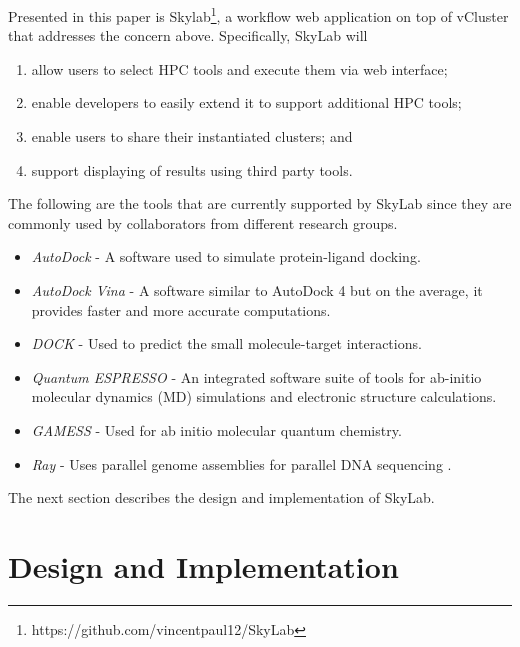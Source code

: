 Presented in this paper is Skylab\footnote{https://github.com/vincentpaul12/SkyLab}, a workflow web application on top of vCluster that addresses the concern above. Specifically, SkyLab will  

\begin{enumerate}
	\item allow users to select HPC tools and execute them via web interface; 
	\item enable developers to easily extend it to support additional HPC tools;
	\item enable users to share their instantiated clusters; and
	\item support displaying of results using third party tools.
\end{enumerate}
   
The following are the tools that are currently supported by SkyLab since they are commonly used by collaborators from different research groups.

\begin{itemize}
    	\item \textit{AutoDock} - A software used to simulate protein-ligand docking\cite{morris2009autodock4}.

        \item \textit{AutoDock Vina} - A software similar to AutoDock 4 but on the average, it provides faster and more accurate computations\cite{JCC:JCC21334}. 
            
		\item \textit{DOCK} - Used to predict the small molecule-target interactions\cite{lang2009dock}.
            
      	\item \textit{Quantum ESPRESSO} - An integrated software suite of tools for ab-initio molecular dynamics (MD) simulations and electronic structure calculations\cite{QE-2009}.

  		\item \textit{GAMESS} - Used for ab initio molecular quantum chemistry\cite{1993gamess}.
            
 	    \item \textit{Ray} - Uses parallel genome assemblies for parallel DNA sequencing \cite{boisvert_ray_2012}.

\end{itemize}   
      
The next section describes the design and implementation of SkyLab.
        
\section{Design and Implementation}

